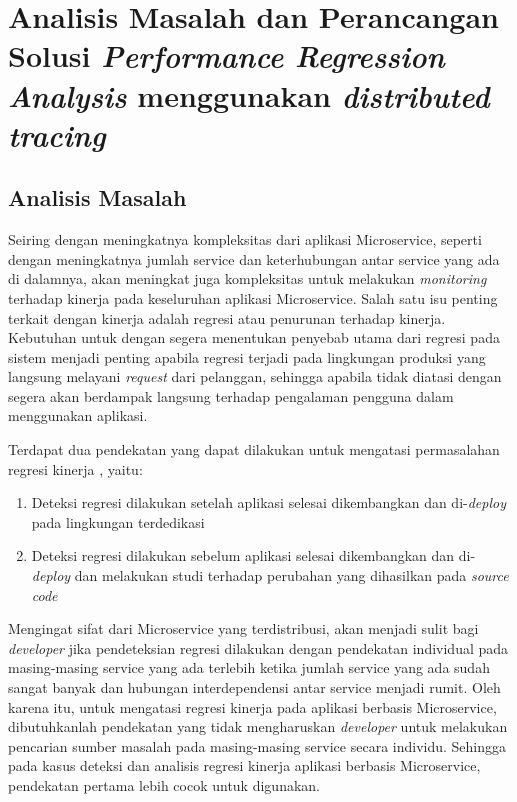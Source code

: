 \chapter{Analisis Masalah dan Perancangan Solusi \textit{Performance Regression Analysis} menggunakan \textit{distributed tracing}}



\section{Analisis Masalah}

Seiring dengan meningkatnya kompleksitas dari aplikasi Microservice, seperti dengan meningkatnya jumlah service dan keterhubungan antar service yang ada di dalamnya, akan meningkat juga kompleksitas untuk melakukan \textit{monitoring} terhadap kinerja pada keseluruhan aplikasi Microservice. Salah satu isu penting terkait dengan kinerja adalah regresi atau penurunan terhadap kinerja. Kebutuhan untuk dengan segera menentukan penyebab utama dari regresi pada sistem menjadi penting apabila regresi terjadi pada lingkungan produksi yang langsung melayani \textit{request} dari pelanggan, sehingga apabila tidak diatasi dengan segera akan berdampak langsung terhadap pengalaman pengguna dalam menggunakan aplikasi. 

Terdapat dua pendekatan yang dapat dilakukan untuk mengatasi permasalahan regresi kinerja \citep{regression-detection}, yaitu:
\begin{enumerate}
	\item Deteksi regresi dilakukan setelah aplikasi selesai dikembangkan dan di-\textit{deploy} pada lingkungan terdedikasi
	\item Deteksi regresi dilakukan sebelum aplikasi selesai dikembangkan dan di-\textit{deploy} dan melakukan studi terhadap perubahan yang dihasilkan pada \textit{source code}
\end{enumerate}  

Mengingat sifat dari Microservice yang terdistribusi, akan menjadi sulit bagi \textit{developer} jika pendeteksian regresi dilakukan dengan pendekatan individual pada masing-masing service yang ada terlebih ketika jumlah service yang ada sudah sangat banyak dan hubungan interdependensi antar service menjadi rumit. Oleh karena itu, untuk mengatasi regresi kinerja pada aplikasi berbasis Microservice, dibutuhkanlah pendekatan yang tidak mengharuskan \textit{developer} untuk melakukan pencarian sumber masalah pada masing-masing service secara individu. Sehingga pada kasus deteksi dan analisis regresi kinerja aplikasi berbasis Microservice, pendekatan pertama lebih cocok untuk digunakan.

